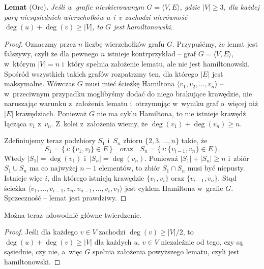 \medskip
\noindent\textsf{\textbf{Lemat} (Ore)\textbf{.}} \textit{Jeśli w~grafie nieskierowanym\/ $G=\langle V,E\rangle$, gdzie\/ $|V|\ge3$, dla każdej pary niesąsiednich wierzchołków\/ $u$ i\/~$v$ zachodzi nierówność\/ $\deg(u)+\deg(v)\ge|V|$, to\/ $G$ jest hamiltonowski.}
\begin{proof}
Oznaczmy przez $n$ liczbę wierzchołków grafu $G$.
Przypuśćmy, że lemat jest fałszywy, czyli że dla pewnego $n$ istnieje kontrprzykład -- graf $G=\langle V,E\rangle$, w~którym $|V|=n$ i~który spełnia założenie lematu, ale nie jest hamiltonowski.
Spośród wszystkich takich grafów rozpatrzmy ten, dla którego $|E|$ jest maksymalne.
Wówczas $G$ musi mieć ścieżkę Hamiltona $\langle v_1,v_2,\dots,v_n\rangle$ -- w~przeciwnym przypadku moglibyśmy dodać do niego brakujące krawędzie, nie naruszając warunku z~założenia lematu i~otrzymując w~wyniku graf o~więcej niż $|E|$ krawędziach.
Ponieważ $G$ nie ma cyklu Hamiltona, to nie istnieje krawędź łącząca $v_1$ z~$v_n$.
Z~kolei z~założenia wiemy, że $\deg(v_1)+\deg(v_n)\ge n$.

Zdefiniujemy teraz podzbiory $S_1$ i~$S_n$ zbioru $\{2,3,\dots,n\}$ takie, że
\[
	S_1 = \bigl\{\,i:\{v_1,v_i\}\in E\,\bigr\} \quad\text{oraz}\quad S_n = \bigl\{\,i:\{v_{i-1},v_n\}\in E\,\bigr\}.
\]
Wtedy $|S_1|=\deg(v_1)$ i~$|S_n|=\deg(v_n)$.
Ponieważ $|S_1|+|S_n|\ge n$ i~zbiór $S_1\cup S_n$ ma co najwyżej $n-1$ elementów, to zbiór $S_1\cap S_n$ musi być niepusty.
Istnieje więc $i$, dla którego istnieją krawędzie $\{v_1,v_i\}$ oraz $\{v_{i-1},v_n\}$.
Stąd ścieżka $\langle v_1,\dots,v_{i-1},v_n,v_{n-1},\dots,v_i,v_1\rangle$ jest cyklem Hamiltona w~grafie $G$.
Sprzeczność -- lemat jest prawdziwy.
\end{proof}

Można teraz udowodnić główne twierdzenie.
\begin{proof}
Jeśli dla każdego $v\in V$ zachodzi $\deg(v)\ge|V|/2$, to $\deg(u)+\deg(v)\ge|V|$ dla każdych $u$, $v\in V$ niezależnie od tego, czy są sąsiednie, czy nie, a~więc $G$ spełnia założenia powyższego lematu, czyli jest hamiltonowski.
\end{proof}
